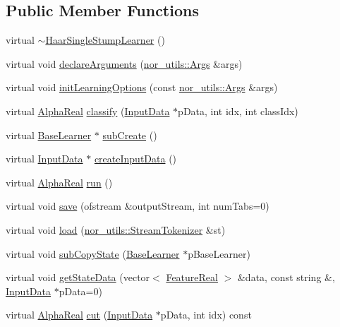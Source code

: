 \subsection*{Public Member Functions}
\begin{DoxyCompactItemize}
\item 
virtual \hyperlink{classMultiBoost_1_1HaarSingleStumpLearner_ab8471396f12b113687b6f8bf2a40f694}{$\sim$HaarSingleStumpLearner} ()
\item 
virtual void \hyperlink{classMultiBoost_1_1HaarSingleStumpLearner_ad994400056663aa2c030fbafaf96ca22}{declareArguments} (\hyperlink{classnor__utils_1_1Args}{nor\_\-utils::Args} \&args)
\item 
virtual void \hyperlink{classMultiBoost_1_1HaarSingleStumpLearner_a547dab8fd220684bf2e6dbbf7cb0708f}{initLearningOptions} (const \hyperlink{classnor__utils_1_1Args}{nor\_\-utils::Args} \&args)
\item 
virtual \hyperlink{Defaults_8h_a80184c4fd10ab70a1a17c5f97dcd1563}{AlphaReal} \hyperlink{classMultiBoost_1_1HaarSingleStumpLearner_a813d5ad76828496e33529a18f57756c2}{classify} (\hyperlink{classMultiBoost_1_1InputData}{InputData} $\ast$pData, int idx, int classIdx)
\item 
virtual \hyperlink{classMultiBoost_1_1BaseLearner}{BaseLearner} $\ast$ \hyperlink{classMultiBoost_1_1HaarSingleStumpLearner_a5bb8091035885f03075d934a9a0effa6}{subCreate} ()
\item 
virtual \hyperlink{classMultiBoost_1_1InputData}{InputData} $\ast$ \hyperlink{classMultiBoost_1_1HaarSingleStumpLearner_a49f7da9444329db0f7a10b2ed0d55d42}{createInputData} ()
\item 
virtual \hyperlink{Defaults_8h_a80184c4fd10ab70a1a17c5f97dcd1563}{AlphaReal} \hyperlink{classMultiBoost_1_1HaarSingleStumpLearner_a350c476169df330f1adedd040e96ff32}{run} ()
\item 
virtual void \hyperlink{classMultiBoost_1_1HaarSingleStumpLearner_a6a565277105954f5912937ad00b92f1f}{save} (ofstream \&outputStream, int numTabs=0)
\item 
virtual void \hyperlink{classMultiBoost_1_1HaarSingleStumpLearner_adaab98e0964770ed3309939b164a06c9}{load} (\hyperlink{classnor__utils_1_1StreamTokenizer}{nor\_\-utils::StreamTokenizer} \&st)
\item 
virtual void \hyperlink{classMultiBoost_1_1HaarSingleStumpLearner_a918541140437c8d7f7575c76b37ad652}{subCopyState} (\hyperlink{classMultiBoost_1_1BaseLearner}{BaseLearner} $\ast$pBaseLearner)
\item 
virtual void \hyperlink{classMultiBoost_1_1HaarSingleStumpLearner_ab1ae07a9910345e6717cbf17dc55fb77}{getStateData} (vector$<$ \hyperlink{Defaults_8h_a3a11cfe6a5d469d921716ca6291e934f}{FeatureReal} $>$ \&data, const string \&, \hyperlink{classMultiBoost_1_1InputData}{InputData} $\ast$pData=0)
\item 
virtual \hyperlink{Defaults_8h_a80184c4fd10ab70a1a17c5f97dcd1563}{AlphaReal} \hyperlink{classMultiBoost_1_1HaarSingleStumpLearner_a80794c0b71642003fbba26c6f37e4044}{cut} (\hyperlink{classMultiBoost_1_1InputData}{InputData} $\ast$pData, int idx) const 
\end{DoxyCompactItemize}


